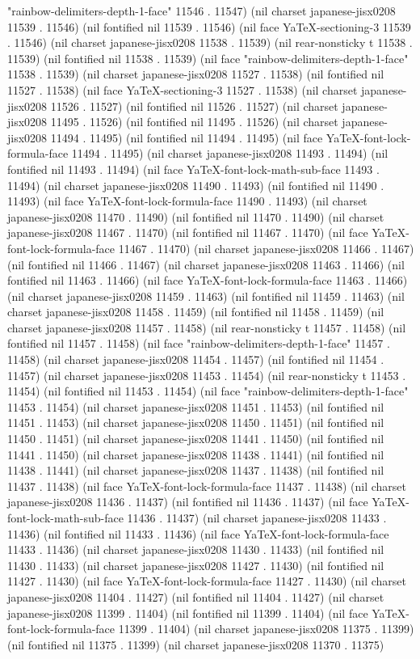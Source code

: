 "rainbow-delimiters-depth-1-face" 11546 . 11547) (nil charset japanese-jisx0208 11539 . 11546) (nil fontified nil 11539 . 11546) (nil face YaTeX-sectioning-3 11539 . 11546) (nil charset japanese-jisx0208 11538 . 11539) (nil rear-nonsticky t 11538 . 11539) (nil fontified nil 11538 . 11539) (nil face "rainbow-delimiters-depth-1-face" 11538 . 11539) (nil charset japanese-jisx0208 11527 . 11538) (nil fontified nil 11527 . 11538) (nil face YaTeX-sectioning-3 11527 . 11538) (nil charset japanese-jisx0208 11526 . 11527) (nil fontified nil 11526 . 11527) (nil charset japanese-jisx0208 11495 . 11526) (nil fontified nil 11495 . 11526) (nil charset japanese-jisx0208 11494 . 11495) (nil fontified nil 11494 . 11495) (nil face YaTeX-font-lock-formula-face 11494 . 11495) (nil charset japanese-jisx0208 11493 . 11494) (nil fontified nil 11493 . 11494) (nil face YaTeX-font-lock-math-sub-face 11493 . 11494) (nil charset japanese-jisx0208 11490 . 11493) (nil fontified nil 11490 . 11493) (nil face YaTeX-font-lock-formula-face 11490 . 11493) (nil charset japanese-jisx0208 11470 . 11490) (nil fontified nil 11470 . 11490) (nil charset japanese-jisx0208 11467 . 11470) (nil fontified nil 11467 . 11470) (nil face YaTeX-font-lock-formula-face 11467 . 11470) (nil charset japanese-jisx0208 11466 . 11467) (nil fontified nil 11466 . 11467) (nil charset japanese-jisx0208 11463 . 11466) (nil fontified nil 11463 . 11466) (nil face YaTeX-font-lock-formula-face 11463 . 11466) (nil charset japanese-jisx0208 11459 . 11463) (nil fontified nil 11459 . 11463) (nil charset japanese-jisx0208 11458 . 11459) (nil fontified nil 11458 . 11459) (nil charset japanese-jisx0208 11457 . 11458) (nil rear-nonsticky t 11457 . 11458) (nil fontified nil 11457 . 11458) (nil face "rainbow-delimiters-depth-1-face" 11457 . 11458) (nil charset japanese-jisx0208 11454 . 11457) (nil fontified nil 11454 . 11457) (nil charset japanese-jisx0208 11453 . 11454) (nil rear-nonsticky t 11453 . 11454) (nil fontified nil 11453 . 11454) (nil face "rainbow-delimiters-depth-1-face" 11453 . 11454) (nil charset japanese-jisx0208 11451 . 11453) (nil fontified nil 11451 . 11453) (nil charset japanese-jisx0208 11450 . 11451) (nil fontified nil 11450 . 11451) (nil charset japanese-jisx0208 11441 . 11450) (nil fontified nil 11441 . 11450) (nil charset japanese-jisx0208 11438 . 11441) (nil fontified nil 11438 . 11441) (nil charset japanese-jisx0208 11437 . 11438) (nil fontified nil 11437 . 11438) (nil face YaTeX-font-lock-formula-face 11437 . 11438) (nil charset japanese-jisx0208 11436 . 11437) (nil fontified nil 11436 . 11437) (nil face YaTeX-font-lock-math-sub-face 11436 . 11437) (nil charset japanese-jisx0208 11433 . 11436) (nil fontified nil 11433 . 11436) (nil face YaTeX-font-lock-formula-face 11433 . 11436) (nil charset japanese-jisx0208 11430 . 11433) (nil fontified nil 11430 . 11433) (nil charset japanese-jisx0208 11427 . 11430) (nil fontified nil 11427 . 11430) (nil face YaTeX-font-lock-formula-face 11427 . 11430) (nil charset japanese-jisx0208 11404 . 11427) (nil fontified nil 11404 . 11427) (nil charset japanese-jisx0208 11399 . 11404) (nil fontified nil 11399 . 11404) (nil face YaTeX-font-lock-formula-face 11399 . 11404) (nil charset japanese-jisx0208 11375 . 11399) (nil fontified nil 11375 . 11399) (nil charset japanese-jisx0208 11370 . 11375) 